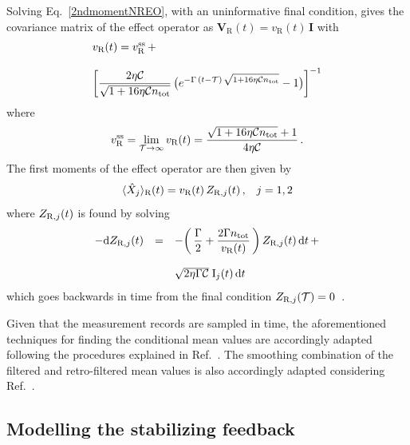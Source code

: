 \documentclass[./Main-revtex.tex]{subfiles}
\begin{document}
Solving Eq.~\eqref{2ndmomentNREO}, with an uninformative final condition, gives the covariance matrix of the effect operator as $\mathbf{V}_\text{R}(t)=v_\text{R}(t)\,\mathbf{I}$ with
\begin{equation}
\begin{array}{l}
    v_{\text R}(t)=v_{\text R}^{\rm ss}\,+\\\\\bigg[\dfrac{2\eta \mathcal{C}}{\sqrt{1+16\eta \mathcal{C} n_\text{tot}}}\,\big(e^{-\Gamma\,(t-{\cal T})\,\sqrt{1+16\eta \mathcal{C} n_\text{tot}} }-1\big)\bigg]^{-1}
\end{array}
\label{VRT}
\end{equation}
where
\begin{equation}
    v_{\text R}^{\rm ss}=\lim_{{\cal T}\to\infty}v_{\text R}(t)=\dfrac{\sqrt{1+16\eta \mathcal{C} n_\text{tot}}+1}{4\eta \mathcal{C}}\,.
    \label{VRSS}
\end{equation}
The first moments of the effect operator are then given by
\begin{equation}
    \langle \hat{X}_j \rangle_{\text R}(t) = v_{\text R}(t)\,Z_{{\rm R},j}(t)\,,\;\;\;j=1,2
\label{equ:rRT}
\end{equation}
where $Z_{{\rm R},j}(t)$ is found by solving
\begin{equation}
\begin{array}{rll}
    -{\rm d} Z_{{\rm R},j}(t) & = & -\bigg(\,\dfrac{\Gamma}{2}+\dfrac{2\Gamma n_\text{tot}}{v_{\text R}(t)}\,\bigg)\,Z_{{\rm R},j}(t)\,{\rm d} t\,+\\&&\\&&\sqrt{2\eta\Gamma \mathcal{C}}\;\text{I}_{j}(t)\,{\rm d} t
\end{array}
\end{equation}
which goes backwards in time from the final condition $Z_{{\rm R},j}({\cal T})=0$~\cite{laverick2021linear}.

Given that the measurement records are sampled in time, the aforementioned techniques for finding the conditional mean values are accordingly adapted following the procedures explained in Ref.~\cite{stengel1994optimal}. The smoothing combination of the filtered and retro-filtered mean values is also accordingly adapted considering Ref.~\cite{Grewal2014Kalman}.


\subsection{Modelling the stabilizing feedback}\label{SecFeedbackModelling}
\end{document}
